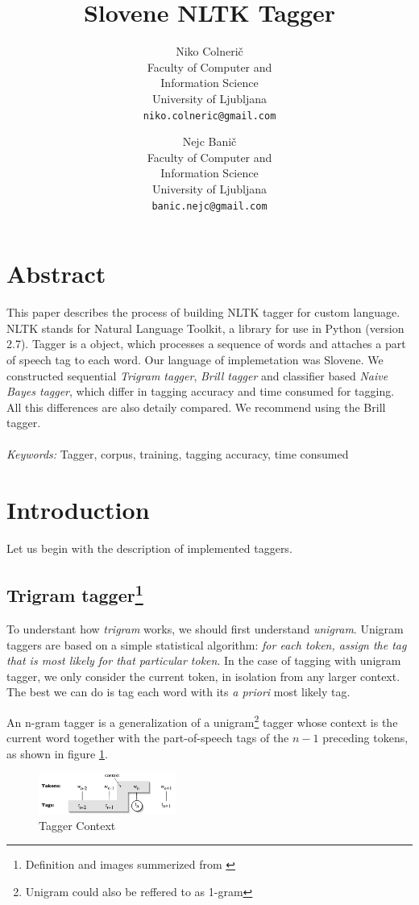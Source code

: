 \documentclass[10pt, conference, compsocconf]{IEEEtran}
\title{Slovene NLTK Tagger}
\author{
	Niko Colnerič \\
	\footnotesize Faculty of Computer and \\
	\footnotesize Information Science \\
	\footnotesize University of Ljubljana \\
	\footnotesize \texttt{niko.colneric@gmail.com} \\
	\and
	Nejc Banič \\
	\footnotesize Faculty of Computer and \\
	\footnotesize Information Science \\
	\footnotesize University of Ljubljana \\
	\footnotesize \texttt{banic.nejc@gmail.com} \\
}
\begin{document}
\maketitle
\thispagestyle{empty}

\section*{Abstract} %
This paper describes the process of building NLTK tagger for custom language. NLTK stands for Natural Language Toolkit, a library for use in Python (version 2.7).
Tagger is a object, which processes a sequence of words and attaches a part of speech tag to each word.
Our language of implemetation was Slovene.
We constructed sequential \textit{Trigram tagger}, \textit{Brill tagger} and classifier based \textit{Naive Bayes tagger}, which differ in tagging accuracy and time consumed for tagging. All this differences are also detaily compared. We recommend using the Brill tagger.
\\\\
\textit{Keywords:} Tagger, corpus, training, tagging accuracy, time consumed

\section{Introduction} %
Let us begin with the description of implemented taggers.

\subsection[Trigram tagger]{Trigram tagger\footnote{Definition and images summerized from \cite{NLTKBOOK}}}
To understant how \textit{trigram} works, we should first understand \textit{unigram}.
Unigram taggers are based on a simple statistical algorithm: \textit{for each token, assign the tag that is most likely for that particular token}.
In the case of tagging with unigram tagger, we only consider the current token, in isolation from any larger context. The best we can do is tag each word with its \textit{a priori} most likely tag.
\par
An n-gram tagger is a generalization of a unigram\footnote{Unigram could also be reffered to as 1-gram} tagger whose context is the current word together with the part-of-speech tags of the $n-1$ preceding tokens, as shown in figure \ref{fig:trigram}.

\begin{figure}[htb]
\begin{center}
\includegraphics[width=0.4\textwidth]{tag-context.png} 
\end{center}
\caption{Tagger Context}
\label{fig:trigram}
\end{figure}
\end{document}
